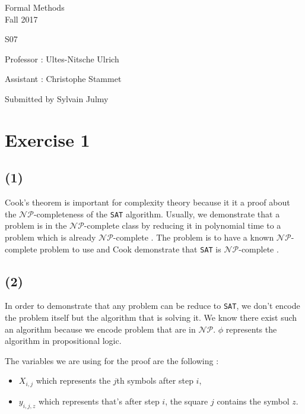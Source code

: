 \documentclass[a4paper,11pt]{report}
\author{Sylvain Julmy}
\date{\today}
\newcommand*{\NPc}{\mathcal{NP}}
\newcommand*{\NPcp}{$\mathcal{NP}$-complete }
\newcommand*{\NPce}{$\mathcal{NP}$-completeness }
\begin{document}
\begin{center}
  \large{
    Formal Methods\\
    Fall 2017
  }
  
  \noindent\makebox[\linewidth]{\rule{\linewidth}{0.4pt}}
  S07
  \noindent\makebox[\linewidth]{\rule{\linewidth}{0.4pt}}

  \begin{flushleft}
    Professor : Ultes-Nitsche Ulrich

    Assistant : Christophe Stammet
  \end{flushleft}

  
  \noindent\makebox[\linewidth]{\rule{\linewidth}{0.4pt}}

  Submitted by Sylvain Julmy
  
  \noindent\makebox[\linewidth]{\rule{\textwidth}{1pt}}
\end{center}

\section*{Exercise 1}

\subsection*{(1)}
Cook's theorem is important for complexity theory because it it a proof about
the \NPce of the \texttt{SAT} algorithm. Usually, we demonstrate that a problem
is in the \NPcp class by reducing it in polynomial time to a problem which is
already \NPcp. The problem is to have a known \NPcp problem to use and Cook
demonstrate that \texttt{SAT} is \NPcp.

\subsection*{(2)}

In order to demonstrate that any problem can be reduce to \texttt{SAT}, we don't
encode the problem itself but the algorithm that is solving it. We know there
exist such an algorithm because we encode problem that are in $\NPc$. $\phi$
represents the algorithm in propositional logic.

The variables we are using for the proof are the following :
\begin{itemize}
\item $X_{i,j}$ which represents the $j$th symbols after step $i$,
\item $y_{i,j,z}$ which represents that's after step $i$, the square $j$
  contains the symbol $z$.
\end{itemize}
\end{document}
